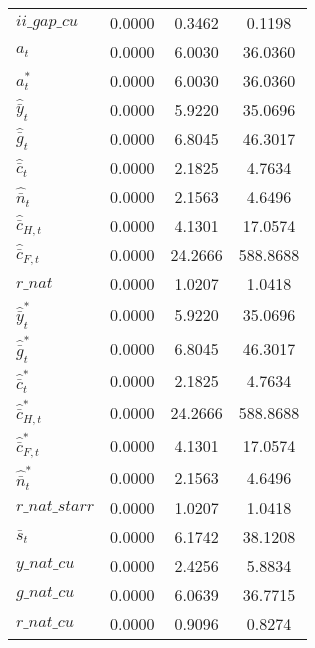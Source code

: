 \begin{center}
\begin{longtable}{lccc}
$ii\_gap\_cu              $	 & 	       0.0000	 & 	       0.3462	 & 	       0.1198 \\ 
${a_t}                    $	 & 	       0.0000	 & 	       6.0030	 & 	      36.0360 \\ 
${a_t^*}                  $	 & 	       0.0000	 & 	       6.0030	 & 	      36.0360 \\ 
${\hat {\bar y}_t}        $	 & 	       0.0000	 & 	       5.9220	 & 	      35.0696 \\ 
${\hat {\bar g}_t}        $	 & 	       0.0000	 & 	       6.8045	 & 	      46.3017 \\ 
${\hat {\bar c}_t}        $	 & 	       0.0000	 & 	       2.1825	 & 	       4.7634 \\ 
${\hat {\bar n}_t}        $	 & 	       0.0000	 & 	       2.1563	 & 	       4.6496 \\ 
${\hat {\bar c}_{H,t}}    $	 & 	       0.0000	 & 	       4.1301	 & 	      17.0574 \\ 
${\hat {\bar c}_{F,t}}    $	 & 	       0.0000	 & 	      24.2666	 & 	     588.8688 \\ 
$r\_nat                   $	 & 	       0.0000	 & 	       1.0207	 & 	       1.0418 \\ 
${\hat {\bar y}_t^*}      $	 & 	       0.0000	 & 	       5.9220	 & 	      35.0696 \\ 
${\hat {\bar g}_t^*}      $	 & 	       0.0000	 & 	       6.8045	 & 	      46.3017 \\ 
${\hat {\bar c}_t^*}      $	 & 	       0.0000	 & 	       2.1825	 & 	       4.7634 \\ 
${\hat {\bar c}_{H,t}^*}  $	 & 	       0.0000	 & 	      24.2666	 & 	     588.8688 \\ 
${\hat {\bar c}_{F,t}^*}  $	 & 	       0.0000	 & 	       4.1301	 & 	      17.0574 \\ 
${\hat {\bar n}_t^*}      $	 & 	       0.0000	 & 	       2.1563	 & 	       4.6496 \\ 
$r\_nat\_starr            $	 & 	       0.0000	 & 	       1.0207	 & 	       1.0418 \\ 
${\bar s_t}               $	 & 	       0.0000	 & 	       6.1742	 & 	      38.1208 \\ 
$y\_nat\_cu               $	 & 	       0.0000	 & 	       2.4256	 & 	       5.8834 \\ 
$g\_nat\_cu               $	 & 	       0.0000	 & 	       6.0639	 & 	      36.7715 \\ 
$r\_nat\_cu               $	 & 	       0.0000	 & 	       0.9096	 & 	       0.8274 \\ 

\end{longtable}
\end{center}
